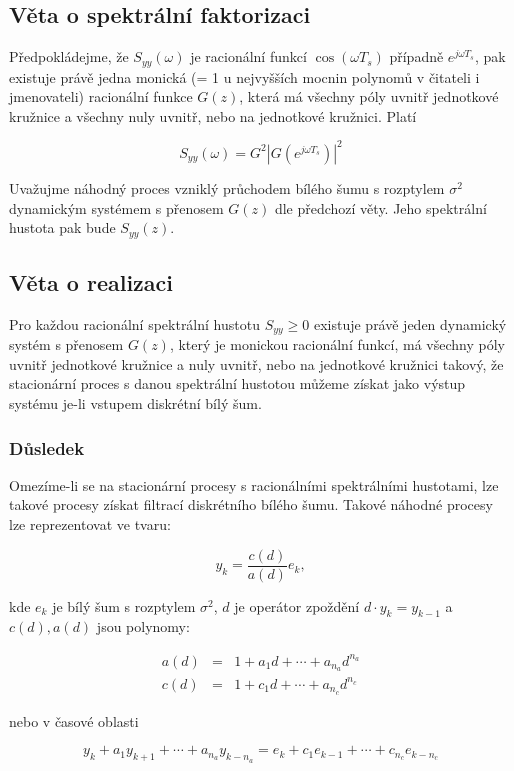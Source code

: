 \subsection{Věta o spektrální faktorizaci}

Předpokládejme, že $S_{yy}(\omega)$ je racionální funkcí $\cos(\omega T_s)$ případně $e^{j\omega T_s}$, pak existuje právě jedna monická (= 1 u nejvyšších mocnin polynomů v čitateli i jmenovateli) racionální funkce $G(z)$, která má všechny póly uvnitř jednotkové kružnice a všechny nuly uvnitř, nebo na jednotkové kružnici. Platí

\[ S_{yy}(\omega) = G^2\left|G\left(e^{j\omega T_s}\right)\right|^2 \]

Uvažujme náhodný proces vzniklý průchodem bílého šumu s rozptylem $\sigma^2$ dynamickým systémem s přenosem $G(z)$ dle předchozí věty. Jeho spektrální hustota pak bude $S_{yy}(z)$.

\subsection{Věta o realizaci}
Pro každou racionální spektrální hustotu $S_{yy}\geq 0$ existuje právě jeden dynamický systém s přenosem $G(z)$, který je monickou racionální funkcí, má všechny póly uvnitř jednotkové kružnice a nuly uvnitř, nebo na jednotkové kružnici takový, že stacionární proces s danou spektrální hustotou můžeme získat jako výstup systému je-li vstupem diskrétní bílý šum.

\subsubsection{Důsledek}
Omezíme-li se na stacionární procesy s racionálními spektrálními hustotami, lze takové procesy získat filtrací diskrétního bílého šumu. Takové náhodné procesy lze reprezentovat ve tvaru:

\[ y_k = \frac{c(d)}{a(d)}e_k, \]

kde $e_k$ je bílý šum s rozptylem $\sigma^2$, $d$ je operátor zpoždění $d\cdot y_k=y_{k-1}$ a $c(d),a(d)$ jsou polynomy:

\begin{eqnarray*}
a(d) & = & 1 + a_1d + \cdots + a_{n_a}d^{n_a}\\
c(d) & = & 1 + c_1d + \cdots + a_{n_c}d^{n_c}
\end{eqnarray*}

nebo v časové oblasti

\[ y_k + a_1y_{k+1}+\cdots+a_{n_a}y_{k-n_a}=e_k+c_1e_{k-1}+\cdots+c_{n_c}e_{k-n_c} \]


